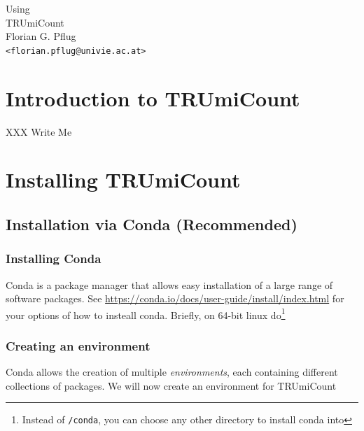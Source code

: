 \documentclass[10pt]{article}
\begin{document}
\begin{titlepage}
\vfill
{\Huge\centering%
Using\\
TRUmiCount\\}
\vskip5cm
{\large\centering%
Florian G. Pflug\\
\texttt{<florian.pflug@univie.ac.at>}\\}
\vfill
\tableofcontents
\vfill
\end{titlepage}

\section{Introduction to TRUmiCount}

XXX Write Me

\newpage
\section{Installing TRUmiCount}

\subsection{Installation via Conda (Recommended)}

\subsubsection*{Installing Conda}

Conda is a package manager that allows easy installation of a large range of software packages. See \url{https://conda.io/docs/user-guide/install/index.html} for your options of how to insteall conda. Briefly, on 64-bit linux do\footnote{Instead of \texttt{/conda}, you can choose any other directory to install conda into}


\subsubsection*{Creating an environment}

Conda allows the creation of multiple \emph{environments}, each containing different collections of packages. We will now create an environment for TRUmiCount
\end{document}
